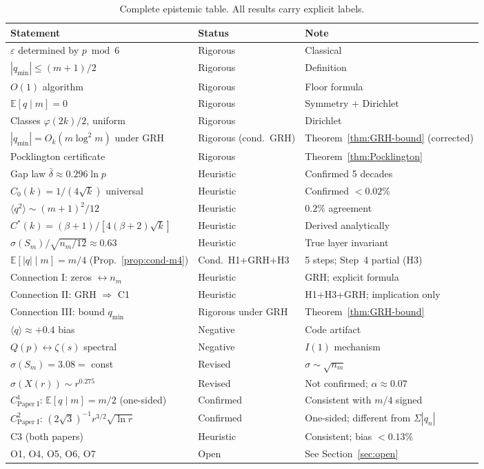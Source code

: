 \documentclass[11pt,a4paper]{article}
\theoremstyle{definition}
\theoremstyle{remark}
\newcommand{\E}{\mathbb{E}}
\newcommand{\qmin}{q_{\min}}
\newcommand{\eps}{\varepsilon}
\begin{document}
\begin{table}[ht]\centering
\caption{Complete epistemic table. All results carry explicit labels.}
\small
\begin{tabular}{@{}p{}p{}p{}@{}}
\toprule
Statement & Status & Note \\
\midrule
$\eps$ determined by $p\bmod 6$ & Rigorous & Classical \\
$|\qmin|\le(m+1)/2$ & Rigorous & Definition \\
$O(1)$ algorithm & Rigorous & Floor formula \\
$\E[q\mid m]=0$ & Rigorous & Symmetry $+$ Dirichlet \\
Classes $\varphi(2k)/2$, uniform & Rigorous & Dirichlet \\
$|\qmin|=O_{k}(m\log^{2}m)$ under GRH & Rigorous (cond.\ GRH) &
Theorem~\ref{thm:GRH-bound} (corrected) \\
Pocklington certificate & Rigorous & Theorem~\ref{thm:Pocklington} \\
\midrule
Gap law $\bar{\delta}\approx 0.296\ln p$ & Heuristic & Confirmed
5 decades \\
$C_{0}(k)=1/(4\sqrt{k})$ universal & Heuristic & Confirmed
$<0.02\%$ \\
$\langle q^{2}\rangle\sim(m+1)^{2}/12$ & Heuristic & $0.2\%$
agreement \\
$C^{*}(k)=(\beta+1)/[4(\beta+2)\sqrt{k}]$ & Heuristic & Derived
analytically \\
$\sigma(S_{m})/\sqrt{n_{m}/12}\approx 0.63$ & Heuristic & True layer
invariant \\
$\E[|q|\mid m]=m/4$ (Prop.~\ref{prop:cond-m4})
 & Cond.\ H1+GRH+H3 & 5 steps; Step~4 partial (H3) \\
\midrule
Connection I: zeros $\leftrightarrow n_{m}$ & Heuristic & GRH;
explicit formula \\
Connection II: GRH $\Rightarrow$ C1 & Heuristic &
H1+H3+GRH; implication only \\
Connection III: bound $\qmin$ & Rigorous under GRH &
Theorem~\ref{thm:GRH-bound} \\
\midrule
$\langle q\rangle\approx +0.4$ bias & Negative & Code artifact \\
$Q(p)\leftrightarrow\zeta(s)$ spectral & Negative & $I(1)$ mechanism \\
$\sigma(S_{m})=3.08=$ const & Revised & $\sigma\sim\sqrt{n_{m}}$ \\
$\sigma(X(r))\sim r^{0.275}$ & Revised & Not confirmed;
$\alpha\approx 0.07$ \\
\midrule
$C^{1}_{\text{Paper I}}$: $\E[q\mid m]=m/2$ (one-sided) & Confirmed
& Consistent with $m/4$ signed \\
$C^{2}_{\text{Paper I}}$: $(2\sqrt{3})^{-1}r^{3/2}\sqrt{\ln r}$ &
Confirmed & One-sided; different from $\Sigma|q_{n}|$ \\
C3 (both papers) & Heuristic & Consistent; bias $<0.13\%$ \\
\midrule
O1, O4, O5, O6, O7 & Open &
See Section~\ref{sec:open} \\
\bottomrule
\end{tabular}
\end{table}
\end{document}
